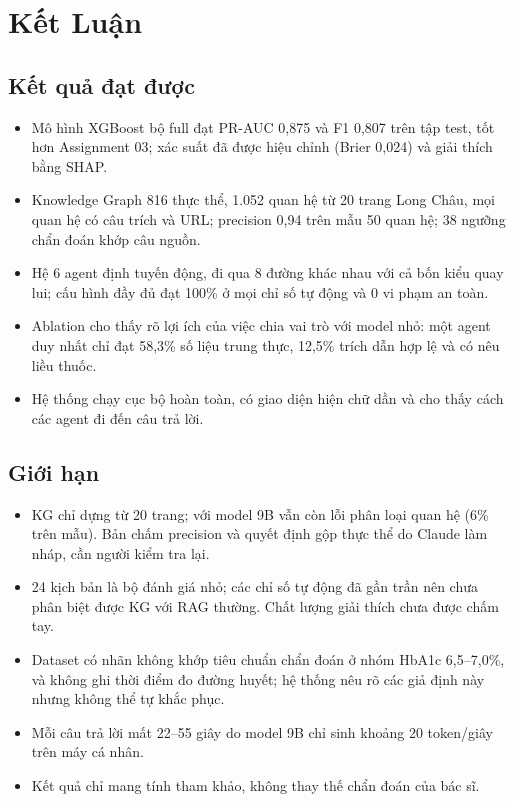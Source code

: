 \documentclass[12pt,a4paper]{report}
\begin{document}
\chapter{Kết Luận}

\section{Kết quả đạt được}
\begin{itemize}[leftmargin=*]
    \item Mô hình XGBoost bộ full đạt PR-AUC 0,875 và F1 0,807 trên tập test, tốt hơn Assignment 03;
          xác suất đã được hiệu chỉnh (Brier 0,024) và giải thích bằng SHAP.
    \item Knowledge Graph 816 thực thể, 1.052 quan hệ từ 20 trang Long Châu, mọi quan hệ có câu trích
          và URL; precision 0,94 trên mẫu 50 quan hệ; 38 ngưỡng chẩn đoán khớp câu nguồn.
    \item Hệ 6 agent định tuyến động, đi qua 8 đường khác nhau với cả bốn kiểu quay lui; cấu hình
          đầy đủ đạt 100\% ở mọi chỉ số tự động và 0 vi phạm an toàn.
    \item Ablation cho thấy rõ lợi ích của việc chia vai trò với model nhỏ: một agent duy nhất chỉ
          đạt 58,3\% số liệu trung thực, 12,5\% trích dẫn hợp lệ và có nêu liều thuốc.
    \item Hệ thống chạy cục bộ hoàn toàn, có giao diện hiện chữ dần và cho thấy cách các agent đi
          đến câu trả lời.
\end{itemize}

\section{Giới hạn}
\begin{itemize}[leftmargin=*]
    \item KG chỉ dựng từ 20 trang; với model 9B vẫn còn lỗi phân loại quan hệ (6\% trên mẫu). Bản
          chấm precision và quyết định gộp thực thể do Claude làm nháp, cần người kiểm tra lại.
    \item 24 kịch bản là bộ đánh giá nhỏ; các chỉ số tự động đã gần trần nên chưa phân biệt được KG
          với RAG thường. Chất lượng giải thích chưa được chấm tay.
    \item Dataset có nhãn không khớp tiêu chuẩn chẩn đoán ở nhóm HbA1c 6,5--7,0\%, và không ghi
          thời điểm đo đường huyết; hệ thống nêu rõ các giả định này nhưng không thể tự khắc phục.
    \item Mỗi câu trả lời mất 22--55 giây do model 9B chỉ sinh khoảng 20 token/giây trên máy cá nhân.
    \item Kết quả chỉ mang tính tham khảo, không thay thế chẩn đoán của bác sĩ.
\end{itemize}
\end{document}
